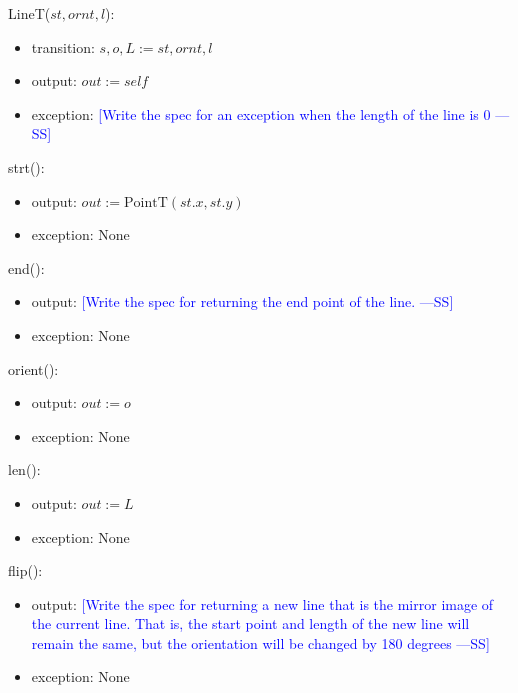 \documentclass[12pt]{article}
\newcommand{\authornote}[3]{\textcolor{#1}{[#3 ---#2]}}
\newcommand{\authornote}[3]{}
\newcommand{\wss}[1]{\authornote{blue}{SS}{#1}}
\begin{document}
LineT($st, ornt, l$):
\begin{itemize}
\item transition: $s, o, L := st, ornt, l$
\item output: $out := \mathit{self}$
\item exception: \wss{Write the spec for an exception when the length of the line is 0}
\end{itemize}

\noindent strt():
\begin{itemize}
\item output: $out := \mbox{PointT}(st.x, st.y)$
\item exception: None
\end{itemize}

\noindent end():
\begin{itemize}
\item output: \wss{Write the spec for returning the end point of the
    line.}

\item exception: None
\end{itemize}

\noindent orient():
\begin{itemize}
\item output: $out := o$
\item exception: None
\end{itemize}

\noindent len():
\begin{itemize}
\item output: $out := L$
\item exception: None
\end{itemize}

\noindent flip():
\begin{itemize}
\item output: \wss{Write the spec for returning a new line that is the mirror
    image of the current line.  That is, the start point and length of the new
    line will remain the same, but the orientation will be changed by 180
    degrees}
\item exception: None
\end{itemize}
\end{document}
